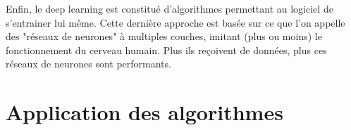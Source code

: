 	Enfin, le deep learning est constitué d'algorithmes permettant au logiciel de s'entrainer lui même. Cette dernière approche est basée sur ce que l'on appelle des "réseaux de neurones" à multiples couches, imitant (plus ou moins) le fonctionnement du cerveau humain. Plus ils reçoivent de données, plus ces réseaux de neurones sont performants. 
	
\section{Application des algorithmes}